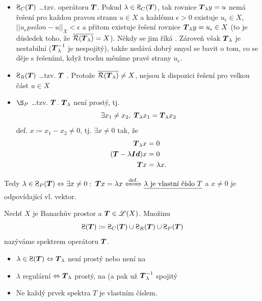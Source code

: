 \begin{remark}
\begin{itemize}
    \item $\Sp_C(\map T)$ \dots tzv.  operátoru $ \boldsymbol{T} $. Pokud $\lambda\in \Sp_C(\map T)$, tak rovnice $\boldsymbol{T}_\lambda y=u$ nemá řešení pro každou pravou stranu $u\in X$ a každému $\epsilon>0$ existuje $u_\epsilon\in X$, $||u_epsilon-u||_X<\epsilon$ a přitom existuje řešení rovnice $\boldsymbol{T}_\lambda y=u_\epsilon\in X$ (to je důsledek toho, že $\overline{\mathcal{R}( \boldsymbol{T}_\lambda)}=X$). Někdy se jim říká . Zároveň však $ \boldsymbol{T}_\lambda$ je nestabilní ($ \boldsymbol{T}_\lambda^{-1}$ je nespojitý), takže nedává dobrý smysl se bavit o tom, co se děje s řešeními, když trochu měníme pravé strany $u_\epsilon$.
    \item $\Sp_R( \map T )$ \dots tzv.   $\boldsymbol{T}$ . Protože $\overline{\mathcal{R}(\boldsymbol{T}_\lambda)}\neq X$, nejsou k dispozici řešení pro velkou část $u\in X$
    \item $\S_P$ \dots tzv.  $ \boldsymbol{T} $. $ \boldsymbol{T}_\lambda$ není prostý, tj. 
    $$\exists x_1\neq x_2,\;  \boldsymbol{T}_\lambda x_1= \boldsymbol{T}_\lambda x_2 $$
    def. $x\coloneqq x_1-x_2\neq 0$, tj. $\exists x\neq 0$ tak, že 
    \begin{equation*}
    \begin{split}
        \boldsymbol{T}_\lambda x &=0 \\
        (\boldsymbol{T} -\lambda\boldsymbol{Id})x&=0\\
        \boldsymbol{T} x&=\lambda x.
    \end{split} 
    \end{equation*}
    
\end{itemize}
\end{remark}


Tedy $\lambda\in\Sp_P(\map T) \Leftrightarrow \exists x\neq 0:\; \map Tx = \lambda x \xLeftrightarrow{\text{def.}} \uu{\lambda\text{ je vlastní číslo }T}$ a $x\neq0$ je odpovídající vl. vektor.

\begin{definition}
Nechť $X$ je Banachův prostor a $\boldsymbol{T} \in \mathscr{L}(X)$. Množinu $$ \Sp(\map T)\coloneqq \Sp_C(\map T)\cup \Sp_R(\map T) \cup \Sp_P(\map T)$$ nazýváme spektrem operátoru $\boldsymbol{T}$.
\end{definition}


\begin{itemize}
    \item $\lambda\in \Sp(\map T)\Leftrightarrow \map T_\lambda$ není prostý nebo není na
    \item $\lambda$ regulární $\Leftrightarrow \boldsymbol{T}_\lambda$ prostý, na (a pak už $\boldsymbol{T}_\lambda^{-1}$ spojitý
    \item Ne každý prvek spektra $T$ je vlastním číslem.
\end{itemize}

